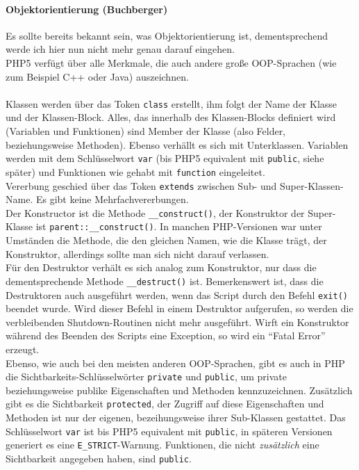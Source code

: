 \paragraph{Objektorientierung (Buchberger)\\}
Es sollte bereits bekannt sein, was Objektorientierung ist, dementsprechend werde ich hier nun nicht mehr genau darauf eingehen.\\
PHP5 verfügt über alle Merkmale, die auch andere große OOP-Sprachen (wie zum Beispiel C++ oder Java) auszeichnen.\\
\\
Klassen werden über das Token \texttt{class} erstellt, ihm folgt der Name der Klasse und der Klassen-Block. Alles, das innerhalb des Klassen-Blocks definiert wird (Variablen und Funktionen) sind Member der Klasse (also Felder, beziehungsweise Methoden). Ebenso verhällt es sich mit Unterklassen. Variablen werden mit dem Schlüsselwort \texttt{var} (bis PHP5 equivalent mit \texttt{public}, siehe später) und Funktionen wie gehabt mit \texttt{function} eingeleitet.\\
Vererbung geschied über das Token \texttt{extends} zwischen Sub- und Super-Klassen-Name. Es gibt keine Mehrfachvererbungen.\\
Der Konstructor ist die Methode \texttt{\_\_construct()}, der Konstruktor der Super-Klasse ist \texttt{parent::\_\_construct()}. In manchen PHP-Versionen war unter Umständen die Methode, die den gleichen Namen, wie die Klasse trägt, der Konstruktor, allerdings sollte man sich nicht darauf verlassen.\\
Für den Destruktor verhält es sich analog zum Konstruktor, nur dass die dementsprechende Methode \texttt{\_\_destruct()} ist. Bemerkenswert ist, dass die Destruktoren auch ausgeführt werden, wenn das Script durch den Befehl \texttt{exit()} beendet wurde. Wird dieser Befehl in einem Destruktor aufgerufen, so werden die verbleibenden Shutdown-Routinen nicht mehr ausgeführt. Wirft ein Konstruktor während des Beenden des Scripts eine Exception, so wird ein \enquote{Fatal Error} erzeugt.\\
Ebenso, wie auch bei den meisten anderen OOP-Sprachen, gibt es auch in PHP die Sichtbarkeits-Schlüsselwörter \texttt{private} und \texttt{public}, um private beziehungsweise publike Eigenschaften und Methoden kennzuzeichnen. Zusätzlich gibt es die Sichtbarkeit \texttt{protected}, der Zugriff auf diese Eigenschaften und Methoden ist nur der eigenen, bezeihungsweise ihrer Sub-Klassen gestattet. Das Schlüsselwort \texttt{var} ist bis PHP5 equivalent mit \texttt{public}, in späteren Versionen generiert es eine \texttt{E\_STRICT}-Warnung. Funktionen, die nicht \textit{zusätzlich} eine Sichtbarkeit angegeben haben, sind \texttt{public}.\\
